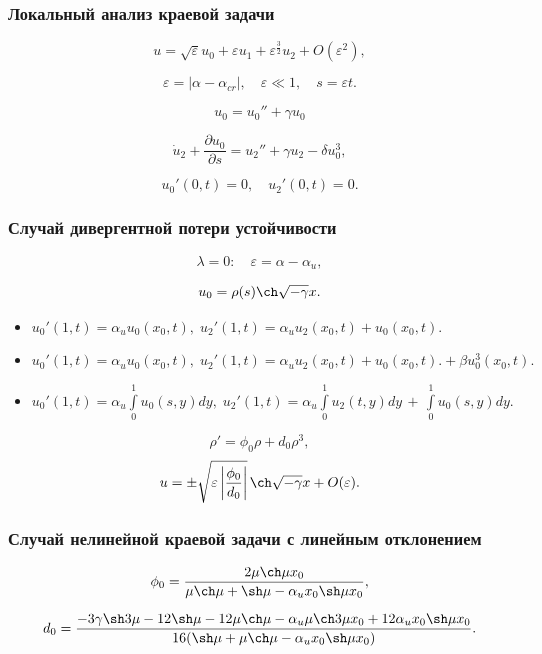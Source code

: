 \documentclass[fullscreen=true, unicode, bookmarks=false]{beamer}
\begin{document}
\begin{frame}
\frametitle{ Локальный анализ краевой задачи }

\begin{equation}
	u = \sqrt{\varepsilon}u_0 + \varepsilon u_1 + \varepsilon^{\frac{3}{2}} u_2 + O(\varepsilon^2),
\end{equation}

$$ \varepsilon = | \alpha - \alpha_{cr} |, \quad \varepsilon \ll 1, \quad s = \varepsilon t. $$

\vfill

\begin{equation}\label{u_0}
u_0 = u_0'' + \gamma u_0
\end{equation}

\begin{equation}\label{u_2}
\dot u_2 + \frac{\partial u_0}{\partial s} = u_2'' + \gamma u_2 - \delta u_0^3,
\end{equation}

$$ u_0'(0, t) = 0, \quad u_2'(0, t) = 0. $$

\end{frame}

\begin{frame}
\frametitle { Случай дивергентной потери устойчивости }

$$ \lambda = 0: \quad \varepsilon = \alpha - \alpha_u, $$

$$ u_0 = \rho(s) \ch \sqrt{-\gamma} x. $$
\vfill
\begin{itemize}
\item $ u_0'(1, t) = \alpha_u u_0(x_0, t), \; u_2'(1, t) = \alpha_u u_2(x_0, t) + u_0(x_0, t). $
\item $ u_0'(1, t) = \alpha_u u_0(x_0, t), \; u_2'(1, t) = \alpha_u u_2(x_0, t) + u_0(x_0, t). + \beta u_0^3(x_0, t). $
\item $ u_0'(1, t) = \alpha_u\int\limits_{0}^{1} u_0(s, y) dy, \; u_2'(1, t) = \alpha_u\int\limits_{0}^{1} u_2(t, y) dy \, + \, \int\limits_{0}^{1} u_0(s, y) dy. $
\end{itemize}
\vfill
\begin{equation}\label{ro_equation}
	\rho' = \phi_0 \rho + d_0 \rho^3,
\end{equation}
\vfill
$$ u = \pm \sqrt{ \varepsilon \left|\dfrac{\phi_0}{d_0}\right| } \, \ch \sqrt{-\gamma} x + O(\varepsilon). $$
\end{frame}

\begin{frame}
\frametitle {Случай нелинейной краевой задачи с линейным отклонением }

$$ \phi_0 = \frac{ 2 \mu \ch \mu x_0 }{ \mu \ch \mu +\sh \mu - \alpha_u x_0 \sh \mu x_0 }, $$

$$ d_0 = \frac{ -3\gamma \sh 3\mu - 12 \sh \mu - 12 \mu \ch \mu - \alpha_u \mu \ch 3\mu x_0 + 12 \alpha_u x_0 \sh \mu x_0 }{ 16( \sh \mu + \mu \ch \mu - \alpha_u x_0 \sh \mu x_0 ) }. $$

\end{frame}
\end{document}
